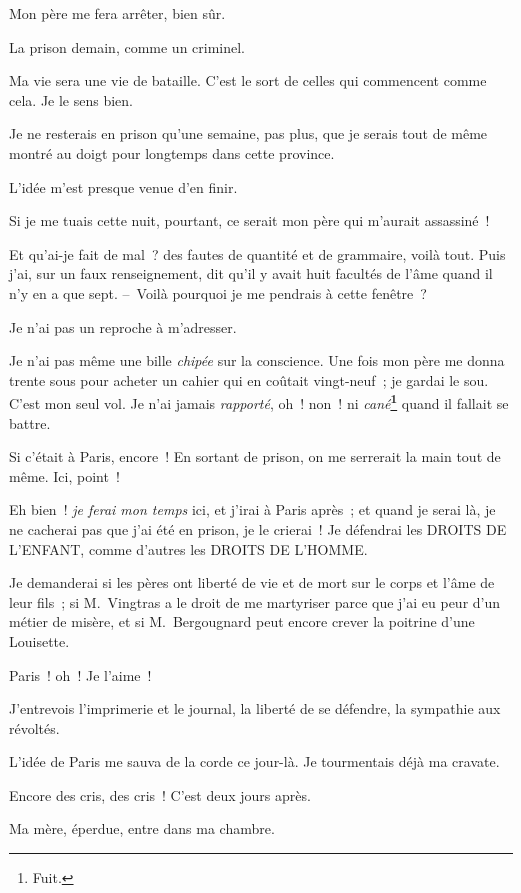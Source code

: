 \documentclass[french,twoside]{book} %
\begin{document}
\noindent Mon père me fera arrêter, bien sûr.\par
La prison demain, comme un criminel.\par
Ma vie sera une vie de bataille. C’est le sort de celles qui commencent comme cela. Je le sens bien.\par
Je ne resterais en prison qu’une semaine, pas plus, que je serais tout de même montré au doigt pour longtemps dans cette province.\par
L’idée m’est presque venue d’en finir.\par
Si je me tuais cette nuit, pourtant, ce serait mon père qui m’aurait assassiné !\par
Et qu’ai-je fait de mal ? des fautes de quantité et de grammaire, voilà tout. Puis j’ai, sur un faux renseignement, dit qu’il y avait huit facultés de l’âme quand il n’y en a que sept. – Voilà pourquoi je me pendrais à cette fenêtre ?\par
Je n’ai pas un reproche à m’adresser.\par
Je n’ai pas même une bille \emph{chipée} sur la conscience. Une fois mon père me donna trente sous pour acheter un cahier qui en coûtait vingt-neuf ; je gardai le sou. C’est mon seul vol. Je n’ai jamais \emph{rapporté}, oh ! non ! ni \emph{cané}\textbf{\footnote{Fuit.}} quand il fallait se battre.\par
Si c’était à Paris, encore ! En sortant de prison, on me serrerait la main tout de même. Ici, point !\par
Eh bien ! \emph{je ferai mon temps} ici, et j’irai à Paris après ; et quand je serai là, je ne cacherai pas que j’ai été en prison, je le crierai ! Je défendrai les DROITS DE L’ENFANT, comme d’autres les DROITS DE L’HOMME.\par
Je demanderai si les pères ont liberté de vie et de mort sur le corps et l’âme de leur fils ; si M. Vingtras a le droit de me martyriser parce que j’ai eu peur d’un métier de misère, et si M. Bergougnard peut encore crever la poitrine d’une Louisette.\par
Paris ! oh ! Je l’aime !\par
J’entrevois l’imprimerie et le journal, la liberté de se défendre, la sympathie aux révoltés.\par
L’idée de Paris me sauva de la corde ce jour-là. Je tourmentais déjà ma cravate.\par
\bigbreak
\noindent Encore des cris, des cris ! C’est deux jours après.\par
Ma mère, éperdue, entre dans ma chambre.\par
\end{document}
